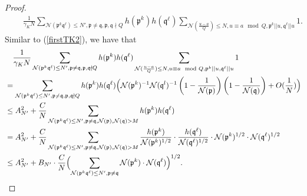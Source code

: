 \documentclass[11pt]{amsart}
\theoremstyle{definition}
\newcommand{\NN}{{\mathcal N}}
\newcommand{\mf}{\mathfrak}
\begin{document}
\begin{proof}
\begin{equation}
\begin{split}
        &\quad \frac{1}{\gamma_{K} N}\sum_{\NN(\mf p^{k}\mf q^{\ell}) \leq N', \mf p\neq \mf q,\mf p,\mf q\nmid Q} h(\mf p^{k})h(\mf q^{\ell})\sum_{\NN(\frac{u-a}{Q})\leq N, u\equiv a \mod Q, \mf p^{k}||u, \mf q^{\ell}||u}1.
    \end{split}
\end{equation}
Similar to (\ref{firstTK2}), we have that
\begin{equation}\label{secondTK3}
    \begin{split}
        &\quad \frac{1}{\gamma_{K} N}\sum_{\NN(\mf p^{k}\mf q^{\ell}) \leq N', \mf p\neq \mf q,\mf p,\mf q\nmid Q} h(\mf p^{k})h(\mf q^{\ell})\sum_{\NN(\frac{u-a}{Q})\leq N, u\equiv a \mod Q, \mf p^{k}||u, \mf q^{\ell}||u}1
        \\&=\sum_{\NN(\mf p^{k}\mf q^{\ell})\leq N', \mf p\neq \mf q, \mf p,\mf q\nmid Q} h(\mf p^{k})h(\mf q^{\ell})\Bigl(\NN(\mf p^k)^{-1}\NN(\mf q^l)^{-1}\left(1-\frac{1}{\NN(\mf p)}\right) \left(1-\frac{1}{\NN(\mf q)}\right)+O(\frac{1}{N})\Bigr)
        \\&\leq A_{N'}^{2}+\frac{C}{N}\sum_{\NN(\mf p^{k}\mf q^{\ell})\leq N', \mf p\neq \mf q, \NN(\mf p),\NN(\mf q)>M} h(\mf p^{k})h(\mf q^{\ell})     %
        \\&=A_{N'}^{2}+\frac{C}{N}\sum_{\NN(\mf p^{k}\mf q^{\ell})\leq N', \mf p\neq \mf q, \NN(\mf p),\NN(\mf q)>M} \frac{h(\mf p^{k})}{\NN(\mf p^{k})^{1/2}}\cdot\frac{h(\mf q^{\ell})}{\NN(\mf q^{\ell})^{1/2}}\cdot \NN(\mf p^{k})^{1/2}\cdot \NN(\mf q^{\ell})^{1/2}
        \\&\leq A_{N'}^{2}+B_{N'}\cdot\frac{C}{N}\Bigl(\sum_{\NN(\mf p^{k}\mf q^{\ell})\leq N', \mf p\neq \mf q} \NN(\mf p^{k})\cdot \NN(\mf q^{\ell})\Bigr)^{1/2}.
            \end{split}
\end{equation}

{\color{red}

}
\end{proof}
\end{document}
